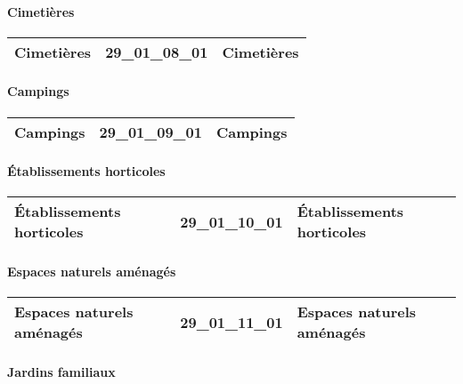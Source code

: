 \documentclass[12pt,titlepage,oneside]{book}
\begin{document}
\paragraph{Cimetières}
\noindent
\vspace{\baselineskip}

\renewcommand{\arraystretch}{1.2}
\begin{supertabular}{|p{10cm}|c|p{15cm}|}
 Cimetières & 29\_01\_08\_01 & Cimetières\\
\hline
\end{supertabular}


\paragraph{Campings}
\noindent
\vspace{\baselineskip}

\renewcommand{\arraystretch}{1.2}
\begin{supertabular}{|p{10cm}|c|p{15cm}|}
 Campings & 29\_01\_09\_01 & Campings\\
\hline
\end{supertabular}


\paragraph{Établissements horticoles}
\noindent
\vspace{\baselineskip}

\renewcommand{\arraystretch}{1.2}
\begin{supertabular}{|p{10cm}|c|p{15cm}|}
 Établissements horticoles & 29\_01\_10\_01 & Établissements horticoles\\
\hline
\end{supertabular}


\paragraph{Espaces naturels aménagés}
\noindent
\vspace{\baselineskip}

\renewcommand{\arraystretch}{1.2}
\begin{supertabular}{|p{10cm}|c|p{15cm}|}
 Espaces naturels aménagés & 29\_01\_11\_01 & Espaces naturels aménagés\\
\hline
\end{supertabular}


\paragraph{Jardins familiaux}
\noindent
\vspace{\baselineskip}
\end{document}
